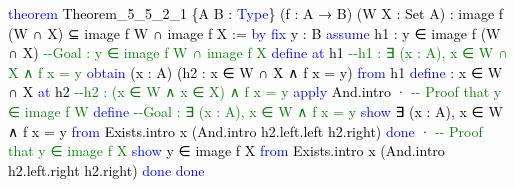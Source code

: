 \documentclass[
  letterpaper,
  DIV=11,
  numbers=noendperiod]{scrreprt}
\newenvironment{Shaded}{\begin{snugshade}}{\end{snugshade}}
\newcommand{\CommentTok}[1]{\textcolor[rgb]{0.37,0.37,0.37}{#1}}
\newcommand{\KeywordTok}[1]{\textcolor[rgb]{0.00,0.23,0.31}{#1}}
\newcommand{\NormalTok}[1]{\textcolor[rgb]{0.00,0.23,0.31}{#1}}
\renewcommand{\NormalTok}[1]{\textcolor[HTML]{000000}{#1}}
\renewcommand{\KeywordTok}[1]{\textcolor[HTML]{0000FF}{#1}}
\renewcommand{\CommentTok}[1]{\textcolor[HTML]{008000}{#1}}
\theoremstyle{remark}
\begin{document}
\begin{Shaded}
\begin{Highlighting}[]
\KeywordTok{theorem}\NormalTok{ Theorem\_5\_5\_2\_1 \{A B : }\KeywordTok{Type}\NormalTok{\} (f : A → B) (W X : Set A) :}
\NormalTok{    image f (W ∩ X) ⊆ image f W ∩ image f X := }\KeywordTok{by}
  \KeywordTok{fix}\NormalTok{ y : B}
  \KeywordTok{assume}\NormalTok{ h1 : y ∈ image f (W ∩ X)  }\CommentTok{{-}{-}Goal : y ∈ image f W ∩ image f X}
  \KeywordTok{define} \KeywordTok{at}\NormalTok{ h1                     }\CommentTok{{-}{-}h1 : ∃ (x : A), x ∈ W ∩ X ∧ f x = y}
  \KeywordTok{obtain}\NormalTok{ (x : A) (h2 : x ∈ W ∩ X ∧ f x = y) }\KeywordTok{from}\NormalTok{ h1}
  \KeywordTok{define}\NormalTok{ : x ∈ W ∩ X }\KeywordTok{at}\NormalTok{ h2         }\CommentTok{{-}{-}h2 : (x ∈ W ∧ x ∈ X) ∧ f x = y}
  \KeywordTok{apply}\NormalTok{ And.intro}
\NormalTok{  · }\CommentTok{{-}{-} Proof that y ∈ image f W}
    \KeywordTok{define}                         \CommentTok{{-}{-}Goal : ∃ (x : A), x ∈ W ∧ f x = y}
    \KeywordTok{show}\NormalTok{ ∃ (x : A), x ∈ W ∧ f x = y }\KeywordTok{from}
\NormalTok{      Exists.intro x (And.intro h2.left.left h2.right)}
    \KeywordTok{done}
\NormalTok{  · }\CommentTok{{-}{-} Proof that y ∈ image f X}
    \KeywordTok{show}\NormalTok{ y ∈ image f X }\KeywordTok{from}
\NormalTok{      Exists.intro x (And.intro h2.left.right h2.right)}
    \KeywordTok{done}
  \KeywordTok{done}


\end{Highlighting}
\end{Shaded}
\end{document}
